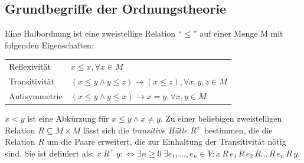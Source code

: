 \subsection{Grundbegriffe der Ordnungstheorie}
Eine Halbordnung ist eine zweistellige Relation "`$\leq$"' auf einer Menge M mit folgenden Eigenschaften:%
\begin{center}
\begin{tabular}{ll}
\toprule
Reflexivität	&$x \leq x, \forall x \in M$\\
Transitivität	&$(x \leq y \land y \leq z) \rightarrow (x \leq z), \forall x,y,z \in M$\\
Antisymmetrie	&$(x\leq y \land y\leq x) \rightarrow x=y, \forall x,y \in M$\\
\bottomrule
\end{tabular} 
\end{center}
$x < y$ ist eine Abkürzung für $x \leq y \land x \neq y$.
Zu einer beliebigen zweistelligen Relation $R \subseteq M \times M$ lässt sich die \emph{transitive Hülle} $R^+$ bestimmen, die die Relation $R$ um die Paare erweitert, die zur Einhaltung der Transitivität nötig sind.
Sie ist definiert als: $x \ R^{+} \ y : \Leftrightarrow \exists n \geq 0 \ \exists e_1,\dots ,e_n \in V: x \,R \,e_1 \,R \,e_2 \,R \dots \,R \,e_n \,R \,y$.


